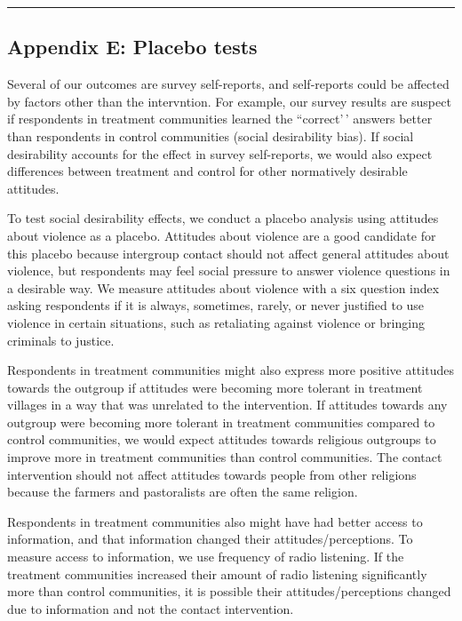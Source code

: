\documentclass[
]{article}
\begin{document}
\begin{center}\rule{0.5\linewidth}{0.5pt}\end{center}

\hypertarget{appendix-e-placebo-tests}{%
\subsection{Appendix E: Placebo tests}\label{appendix-e-placebo-tests}}

Several of our outcomes are survey self-reports, and self-reports could
be affected by factors other than the intervntion. For example, our
survey results are suspect if respondents in treatment communities
learned the ``correct'\,' answers better than respondents in control
communities (social desirability bias). If social desirability accounts
for the effect in survey self-reports, we would also expect differences
between treatment and control for other normatively desirable attitudes.

To test social desirability effects, we conduct a placebo analysis using
attitudes about violence as a placebo. Attitudes about violence are a
good candidate for this placebo because intergroup contact should not
affect general attitudes about violence, but respondents may feel social
pressure to answer violence questions in a desirable way. We measure
attitudes about violence with a six question index asking respondents if
it is always, sometimes, rarely, or never justified to use violence in
certain situations, such as retaliating against violence or bringing
criminals to justice.

Respondents in treatment communities might also express more positive
attitudes towards the outgroup if attitudes were becoming more tolerant
in treatment villages in a way that was unrelated to the intervention.
If attitudes towards any outgroup were becoming more tolerant in
treatment communities compared to control communities, we would expect
attitudes towards religious outgroups to improve more in treatment
communities than control communities. The contact intervention should
not affect attitudes towards people from other religions because the
farmers and pastoralists are often the same religion.

Respondents in treatment communities also might have had better access
to information, and that information changed their
attitudes/perceptions. To measure access to information, we use
frequency of radio listening. If the treatment communities increased
their amount of radio listening significantly more than control
communities, it is possible their attitudes/perceptions changed due to
information and not the contact intervention.
\end{document}
